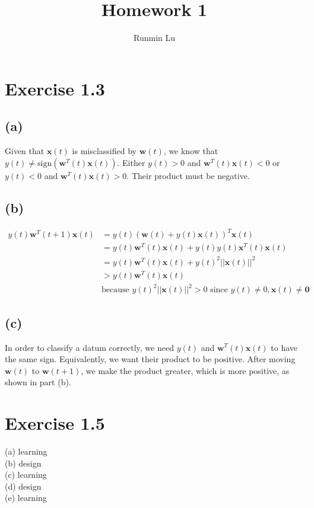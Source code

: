 \documentclass{article}
\title{Homework 1}
\author{Runmin Lu}
\begin{document}
	\maketitle
	
	\section*{Exercise 1.3}
	\subsection*{(a)}
		Given that $\mathbf{x}(t)$ is misclassified by $\mathbf{w}(t)$, we know that $y(t) \neq \text{sign}(\mathbf{w}^T(t)\mathbf{x}(t))$. Either $y(t) > 0$ and $\mathbf{w}^T(t)\mathbf{x}(t) < 0$ or $y(t) < 0$ and $\mathbf{w}^T(t)\mathbf{x}(t) > 0$. Their product must be negative.
		
	\subsection*{(b)}
		\begin{align*}
			y(t)\mathbf{w}^T(t+1)\textbf{x}(t) &= y(t)(\mathbf{w}(t) + y(t)\mathbf x(t))^T\mathbf x(t)\\
			&= y(t)\mathbf{w}^T(t)\textbf{x}(t) + y(t)y(t)\mathbf x^T(t)\mathbf x(t)\\
			&= y(t)\mathbf{w}^T(t)\textbf{x}(t) + y(t)^2||\mathbf x(t)||^2\\
			&> y(t)\mathbf{w}^T(t)\textbf{x}(t)\\
			&\text{because } y(t)^2||\mathbf x(t)||^2 > 0 \text{ since } y(t) \neq 0, \mathbf x(t) \neq \mathbf 0
		\end{align*}
		
	\subsection*{(c)}
		In order to classify a datum correctly, we need $y(t)$ and $\mathbf{w}^T(t)\textbf{x}(t)$ to have the same sign. Equivalently, we want their product to be positive. After moving $\mathbf{w}(t)$ to $\mathbf{w}(t+1)$, we make the product greater, which is more positive, as shown in part (b).
		
	\section*{Exercise 1.5}
		(a) learning\\
		(b) design\\
		(c) learning\\
		(d) design\\
		(e) learning
		
\end{document}
